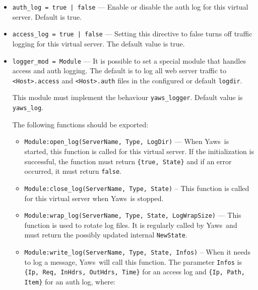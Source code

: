 \documentclass[11pt,oneside,english]{book}
\newcommand{\Yaws}            %
        {{\sc Yaws}}
\begin{document}
\begin{itemize}
\item       \verb+auth_log = true | false+ ---
              Enable or disable the auth log for this virtual server.
              Default is true.

\item       \verb+access_log = true | false+ ---
              Setting  this  directive  to  false turns off
              traffic logging for this virtual server. The
              default value is true.

\item       \verb+logger_mod = Module+ ---
              It is possible to set a special module that handles access and
              auth logging. The default is to log all web server traffic to
              \verb+<Host>.access+ and \verb+<Host>.auth+ files in the
              configured or default \verb+logdir+.

              This module must implement the behaviour
              \verb+yaws_logger+. Default value is \verb+yaws_log+.

              The following functions should be exported:

              \begin{itemize}

              \item \verb+Module:open_log(ServerName, Type, LogDir)+ --- When
                \Yaws\ is started, this function is called for this virtual
                server. If the initialization is successful, the function must
                return \verb+{true, State}+ and if an error occurred, it must
                return \verb+false+.

              \item \verb+Module:close_log(ServerName, Type, State)+ -- This
                function is called for this virtual server when
                \Yaws\ is stopped.

              \item \verb+Module:wrap_log(ServerName, Type, State, LogWrapSize)+
                --- This function is used to rotate log files. It is regularly
                called by \Yaws\ and must return the possibly updated internal
                \verb+NewState+.

              \item \verb+Module:write_log(ServerName, Type, State, Infos)+ --
                When it needs to log a message, \Yaws\ will call this
                function. The parameter \verb+Infos+ is
                \verb+{Ip, Req, InHdrs, OutHdrs, Time}+ for an access log and
                \verb+{Ip, Path, Item}+ for an auth log, where:


\end{itemize}
\end{itemize}
\end{document}
